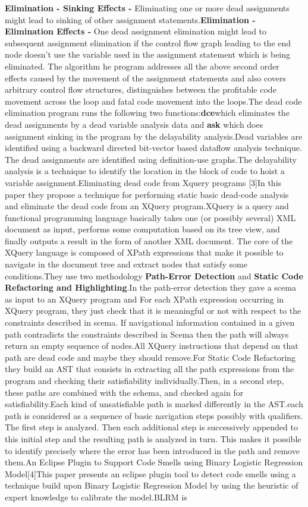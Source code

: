 \documentclass[conference]{IEEEtran}
\begin{document}
\textbf{Elimination - Sinking Effects -} Eliminating one or more dead assignments might lead to sinking of other assignment statements.\textbf{Elimination - Elimination Effects -} One dead assignment elimination might lead to subsequent assignment elimination if the control flow graph leading to the end node doesn’t use the variable used in the assignment statement which is being eliminated. The algorithm he program addresses all the above second order effects caused by the movement of the assignment statements and also covers arbitrary control flow structures, distinguishes between the profitable code movement across the loop and fatal code movement into the loops.The dead code elimination program runs the following two functions:\textbf{dce}which eliminates the dead assignments by a dead variable analysis data and \textbf{ask} which does assignment sinking in the program by the delayability analysis.Dead variables are identified using a backward directed bit-vector based dataflow analysis technique. The dead assignments are identified using definition-use graphs.The delayability analysis is a technique to identify the location in the block of code to hoist a variable assignment.Eliminating dead code from Xquery programs [3]In this paper they propose a technique for performing static basic dead-code analysis and eliminate the dead code from an XQuery program.XQuery is a query and functional programming language basically takes one (or possibly several) XML document as input, performs some computation based on its tree view, and finally outputs a result in the form of another XML document. The core of the XQuery language is composed of XPath expressions that make it possible to navigate in the document tree and extract nodes that satisfy some conditions.They use two methodology \textbf{Path-Error Detection} and \textbf{Static Code Refactoring and Highlighting}.In the path-error detection they gave a scema as input to an XQuery program and For each XPath expression occurring in XQuery program, they just check that it is meaningful or not with respect to the constraints described in scema. If navigational information contained in a given path contradicts the constraints described in Scema then the path will always return an empty sequence of nodes.All XQuery instructions that depend on that path are dead code and maybe they should remove.For Static Code Refactoring they build an AST that consists in extracting all the path expressions from the program and checking their satisfiability individually.Then, in a second step, these paths are combined with the schema, and checked again for satisfiability.Each kind of unsatisfiable path is marked differently in the AST.each path is considered as a sequence of basic navigation steps possibly with qualifiers. The first step is analyzed. Then each additional step is successively appended to this initial step and the resulting path is analyzed in turn. This makes it possible to identify precisely where the error has been introduced in the path and remove them.An Eclipse Plugin to Support Code Smells using Binary Logistic Regression Model[4]This paper presents an eclipse plugin tool to detect code smells using a technique build upon Binary Logistic Regression Model by using the heuristic of expert knowledge to calibrate the model.BLRM is 
\end{document}
